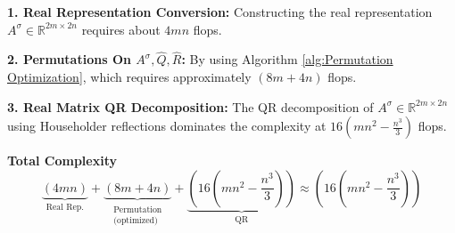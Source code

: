 \documentclass{book}
\theoremstyle{remark}
\begin{document}
\begin{multicols}{2}
\textbf{1. Real Representation Conversion:}
Constructing the real representation $A^\sigma \in \mathbb{R}^{2m \times 2n}$ requires about $4mn$ flops. 

\textbf{2. Permutations On $A^\sigma, \widehat{Q}, \widehat{R}$:}
By using Algorithm \ref{alg:Permutation Optimization},  which requires approximately  $(8m+4n)$ flops.

\textbf{3. Real Matrix QR Decomposition:}
The QR decomposition of $A^\sigma \in \mathbb{R}^{2m \times 2n}$ using Householder reflections dominates the complexity at $16(mn^2-\frac{n^3}{3})$ flops.

\textbf{Total Complexity}
$$
\underbrace{(4mn)}_{\text{Real Rep.}} + \underbrace{(8m+4n)}_{\substack{\text{Permutation} \\ \text{(optimized)}}} + \underbrace{(16(mn^2-\frac{n^3}{3}))}_{\text{QR}} \approx \boxed{(16(mn^2-\frac{n^3}{3}))}
$$  

\end{multicols}
\end{document}

